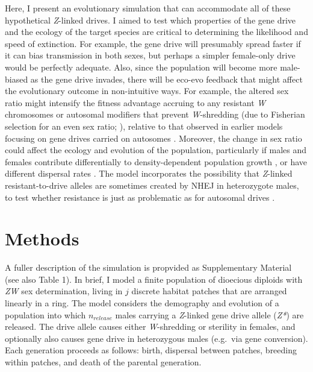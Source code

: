 \documentclass[]{rsos}%
\begin{document}
Here, I present an evolutionary simulation that can accommodate all of
these hypothetical \emph{Z}-linked drives. I aimed to test which
properties of the gene drive and the ecology of the target species are
critical to determining the likelihood and speed of extinction. For
example, the gene drive will presumably spread faster if it can bias
transmission in both sexes, but perhaps a simpler female-only drive
would be perfectly adequate. Also, since the population will become more
male-biased as the gene drive invades, there will be eco-evo feedback
that might affect the evolutionary outcome in non-intuitive ways. For
example, the altered sex ratio might intensify the fitness advantage
accruing to any resistant \emph{W} chromosomes or autosomal modifiers
that prevent \emph{W}-shredding (due to Fisherian selection for an even
sex ratio; \citep{holman2015co}), relative to that observed in earlier
models focusing on gene drives carried on autosomes
\citep{unckless2017ev, drury2017cr}. Moreover, the change in sex ratio
could affect the ecology and evolution of the population, particularly
if males and females contribute differentially to density-dependent
population growth \citep{rankin2007ma, li2019int}, or have different
dispersal rates \citep{li2019sex}. The model incorporates the
possibility that \emph{Z}-linked resistant-to-drive alleles are
sometimes created by NHEJ in heterozygote males, to test whether
resistance is just as problematic as for autosomal drives
\citep{gantz2015mu, gantz2015hi, hammond2016cr, wang2016cr, unckless2017ev}.

\hypertarget{methods}{%
\section{Methods}\label{methods}}

A fuller description of the simulation is propvided as Supplementary
Material (see also Table 1). In brief, I model a finite population of
dioecious diploids with \emph{ZW} sex determination, living in \(j\)
discrete habitat patches that are arranged linearly in a ring. The model
considers the demography and evolution of a population into which
\(n_{release}\) males carrying a \emph{Z}-linked gene drive allele
(\emph{Z*}) are released. The drive allele causes either
\emph{W}-shredding or sterility in females, and optionally also causes
gene drive in heterozygous males (e.g.~via gene conversion). Each
generation proceeds as follows: birth, dispersal between patches,
breeding within patches, and death of the parental generation.
\end{document}
